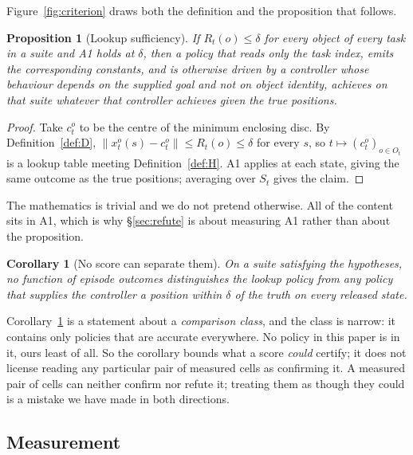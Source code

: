 \documentclass[10pt,twocolumn]{article}
\newtheorem{proposition}{Proposition}
\newtheorem{corollary}{Corollary}
\begin{document}
Figure~\ref{fig:criterion} draws both the definition and the proposition that
follows.

\begin{proposition}[Lookup sufficiency]
\label{prop:lookup}
If $R_t(o) \le \delta$ for every object of every task in a suite and A1 holds
at $\delta$, then a policy that reads only the task index, emits the
corresponding constants, and is otherwise driven by a controller whose
behaviour depends on the supplied goal and not on object identity, achieves on
that suite whatever that controller achieves given the true positions.
\end{proposition}

\begin{proof}
Take $c_t^o$ to be the centre of the minimum enclosing disc. By
Definition~\ref{def:D}, $\lVert x_t^o(s) - c_t^o \rVert \le R_t(o) \le \delta$
for every $s$, so $t \mapsto (c_t^o)_{o \in O_t}$ is a lookup table meeting
Definition~\ref{def:H}. A1 applies at each state, giving the same outcome as
the true positions; averaging over $S_t$ gives the claim.
\end{proof}

\noindent The mathematics is trivial and we do not pretend otherwise. All of
the content sits in A1, which is why \S\ref{sec:refute} is about measuring A1
rather than about the proposition.

\begin{corollary}[No score can separate them]
\label{cor:sep}
On a suite satisfying the hypotheses, no function of episode outcomes
distinguishes the lookup policy from any policy that supplies the controller a
position within $\delta$ of the truth on every released state.
\end{corollary}

\noindent Corollary~\ref{cor:sep} is a statement about a \emph{comparison
class}, and the class is narrow: it contains only policies that are accurate
everywhere. No policy in this paper is in it, ours least of all. So the
corollary bounds what a score \emph{could} certify; it does not license reading
any particular pair of measured cells as confirming it. A measured pair of cells can neither confirm nor refute it; treating them as
though they could is a mistake we have made in both directions.

\subsection{Measurement}
\end{document}
